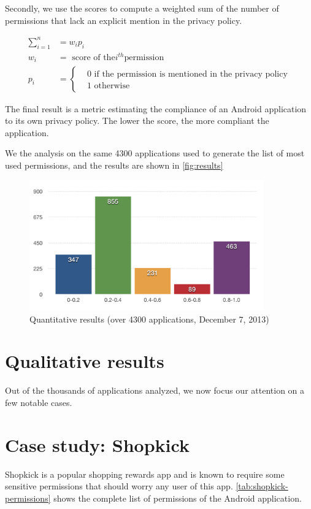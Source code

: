 Secondly, we use the scores to compute a weighted sum of the number of permissions that lack an explicit mention in the privacy policy.

\begin{align}
\label{eq:goodness-metric}
	\sum\limits_{i=1}^n &= w_i p_i \\
	w_i &= \text{ score of the} i^{th} \text{permission} \\
	p_i &=
	\begin{cases}
		& 0 \text{ if the permission is mentioned in the privacy policy} \\
		& 1 \text{ otherwise}
	\end{cases}
\end{align}

The final result is a metric estimating the compliance of an Android application to its own privacy policy. The lower the score, the more compliant the application.

We the analysis on the same 4300 applications used to generate the list of most used permissions, and the results are shown in \autoref{fig:results}

\begin{figure}[t]
\centering
     \includegraphics[width=0.9\textwidth]{images/results}
      \caption{Quantitative results (over 4300 applications, December 7, 2013)}
      \label{fig:results}
\end{figure}

\section{Qualitative results}
\label{sec:qualitative-results}
Out of the thousands of applications analyzed, we now focus our attention on a few notable cases.

\section{Case study: Shopkick}
Shopkick is a popular shopping rewards app and is known \cite{shopkick-lifehacker} to require some sensitive permissions that should worry any user of this app. \autoref{tab:shopkick-permissions} shows the complete list of permissions of the Android application.

